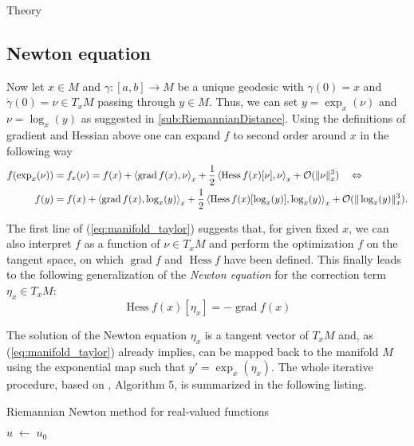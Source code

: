 \begin{chapter}{Theory}
\subsection{Newton equation} %
\label{sub:Newton equation}
Now let $x\in M$ and $\gamma:[a,b] \to M$ be a unique geodesic with $\gamma(0)=x$ and $\dot{\gamma}(0)=\nu\in T_xM$ 
passing through $y\in M$. Thus, we can set $y=\exp_x(\nu)$ and $\nu=\log_x(y)$ as suggested in \ref{sub:RiemannianDistance}. Using the
definitions of gradient and Hessian above one can expand $f$ to second order around $x$ in the following way
\begin{align}
    \label{eq:manifold_taylor}
    f(\exp_x(\nu)) &= f_x(\nu) = f(x) + \left\langle \operatorname{grad}f(x),\nu \right\rangle_x + \frac{1}{2}\left\langle \operatorname{Hess}f(x)[\nu],\nu \right\rangle_x + \mathcal{O}(\| \nu \|_x^3)\quad \Leftrightarrow \\
    f(y) &= f(x) + \left\langle \operatorname{grad}f(x),\log_x(y) \right\rangle_x + \frac{1}{2}\left\langle \operatorname{Hess}f(x)[\log_x(y)],\log_x(y) \right\rangle_x + \mathcal{O}(\| \log_x(y) \|_x^3).\nonumber
\end{align}

The first line of (\ref{eq:manifold_taylor}) suggests that, for given fixed $x$, we can also interpret $f$ as a function of $\nu\in T_xM$ and perform the optimization $f$ on the
tangent space, on which $\operatorname{grad}f$ and $\operatorname{Hess}f$ have been defined. This finally leads to the following generalization of the \emph{Newton equation}
for the correction term $\eta_x \in T_xM$:
\begin{equation}
    \label{eq:newtoneq}
    \operatorname{Hess}f(x)[\eta_x]=-\operatorname{grad}f(x)
\end{equation}

The solution of the Newton equation $\eta_x$ is a tangent vector of $T_xM$ and, as (\ref{eq:manifold_taylor}) already implies, can be mapped back to the manifold $M$ 
using the exponential map such that $y'=\exp_x(\eta_x)$. The whole iterative procedure, based on \cite{Absil2009}, Algorithm 5, is summarized in the following listing.
\begin{algorithm}
\caption{Riemannian Newton method for real-valued functions}
\label{al:real_riemannian_newton}
\begin{algorithmic}
    \STATE $u\; \leftarrow\;u_0$
\end{algorithmic}
\end{algorithm}


\end{chapter}
